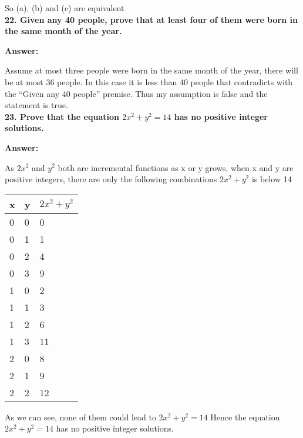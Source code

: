 \documentclass{article}
\begin{document}
\begin{large}
So (a), (b) and (c) are equivalent\\

\textbf{22. Given any 40 people, prove that at least four of them were born in the same month of the year.}

\textbf{Answer:}

Assume at most three people were born in the same month of the year, there will be at most 36 people. In this case it is less than 40 people that contradicts with the ``Given any 40 people'' premise. 
Thus my assumption is false and the statement is true.\\

\textbf{23. Prove that the equation $2x^2+y^2=14$ has no positive integer solutions.}

\textbf{Answer:}

As $2x^2$ and $y^2$ both are incremental functions as x or y grows,
when x and y are positive integers, there are only the following combinations $2x^2 + y^2$ is below 14

\begin{tabular} {   | p{3cm}  |  p{3cm} |  p{4cm}  |}
\hline
x & y & $2x^2 + y^2$ \\
\hline
0 & 0 &  0\\
\hline
0  &1 &  1\\
\hline
0 & 2&   4 \\
\hline
0  &3 &  9 \\
\hline
1  & 0  & 2 \\
\hline
1 & 1 &  3 \\
\hline
1&  2  & 6  \\
\hline
1 & 3 & 11 \\
\hline
2 & 0 &  8 \\
\hline
2 & 1 &  9 \\
\hline
2 & 2&  12 \\
\hline
\end{tabular}

As we can see, none of them could lead to $2x^2+y^2=14$
Hence the equation $2x^2+y^2=14$ has no positive integer solutions.


\end{large}
\end{document}

